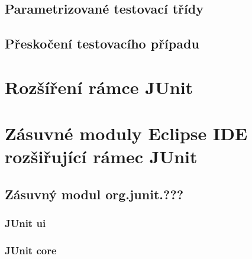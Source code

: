    \subsection{Parametrizované testovací třídy}
    
    \subsection{Přeskočení testovacího případu}

  \section{Rozšíření rámce JUnit}

  \section{Zásuvné moduly Eclipse IDE rozšiřující rámec JUnit}
    \subsection{Zásuvný modul org.junit.???}
    \subsubsection{JUnit ui}
    \subsubsection{JUnit core}
